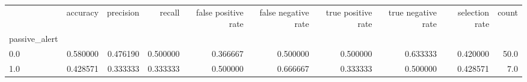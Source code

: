 \begin{tabular}{lrrrrrrrrr}
\toprule
{} &  accuracy &  precision &    recall &  false positive rate &  false negative rate &  true positive rate &  true negative rate &  selection rate &  count \\
passive\_alert &           &            &           &                      &                      &                     &                     &                 &        \\
\midrule
0.0           &  0.580000 &   0.476190 &  0.500000 &             0.366667 &             0.500000 &            0.500000 &            0.633333 &        0.420000 &   50.0 \\
1.0           &  0.428571 &   0.333333 &  0.333333 &             0.500000 &             0.666667 &            0.333333 &            0.500000 &        0.428571 &    7.0 \\
\bottomrule
\end{tabular}
